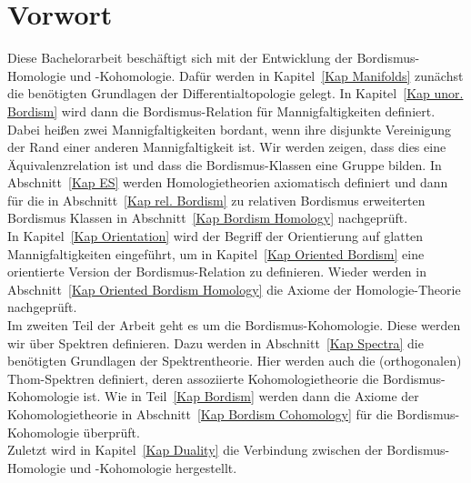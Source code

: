 \documentclass[a4paper,11pt]{article}
\begin{document}
\maketitle
{}
\tableofcontents\newpage

\begin{comment}
\newgeometry{
	left=20mm, %
    top=25mm,
    right=20mm, %
  bmargin=2cm %
}
\end{comment}

\setcounter{section}{-1}

\section*{Vorwort}\label{Vorwort}
Diese Bachelorarbeit besch\"aftigt sich mit der Entwicklung der Bordismus-Homologie und -Kohomologie. Daf\"ur werden in Kapitel\ \ref{Kap Manifolds} zun\"achst die ben\"otigten Grundlagen der Differentialtopologie gelegt. 
In Kapitel\ \ref{Kap unor. Bordism} wird dann die Bordismus-Relation f\"ur Mannigfaltigkeiten definiert. Dabei hei\ss en zwei Mannigfaltigkeiten bordant, wenn ihre disjunkte Vereinigung der Rand einer anderen Mannigfaltigkeit ist. Wir werden zeigen, dass dies eine \"Aquivalenzrelation ist und dass die Bordismus-Klassen eine Gruppe bilden.
In Abschnitt\ \ref{Kap ES} werden Homologietheorien axiomatisch definiert und dann f\"ur die in Abschnitt\ \ref{Kap rel. Bordism} zu relativen Bordismus erweiterten Bordismus Klassen in Abschnitt\ \ref{Kap Bordism Homology} nachgepr\"uft.\\
In Kapitel\ \ref{Kap Orientation} wird der Begriff der Orientierung auf glatten Mannigfaltigkeiten eingef\"uhrt, um in Kapitel\ \ref{Kap Oriented Bordism} eine orientierte Version der Bordismus-Relation zu definieren. Wieder werden in Abschnitt\ \ref{Kap Oriented Bordism Homology} die Axiome der Homologie-Theorie nachgepr\"uft.\\
Im zweiten Teil der Arbeit geht es um die Bordismus-Kohomologie. Diese werden wir \"uber Spektren definieren. Dazu werden in Abschnitt\ \ref{Kap Spectra} die ben\"otigten Grundlagen der Spektrentheorie. Hier werden auch die (orthogonalen) Thom-Spektren definiert, deren assoziierte Kohomologietheorie die Bordismus-Kohomologie ist.
Wie in Teil\ \ref{Kap Bordism} werden dann die Axiome der Kohomologietheorie in Abschnitt\ \ref{Kap Bordism Cohomology} f\"ur die Bordismus-Kohomologie \"uberpr\"uft.\\
Zuletzt wird in Kapitel\ \ref{Kap Duality} die Verbindung zwischen der Bordismus-Homologie und -Kohomologie hergestellt.
\end{document}
